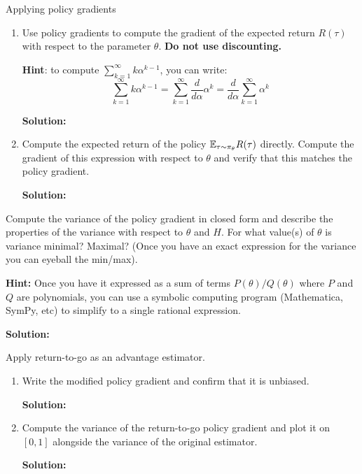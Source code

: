 \documentclass{article}
\begin{document}
\begin{enumerate}
 Applying policy gradients
\begin{enumerate}
    \item Use policy gradients to compute the gradient of the expected return $R(\tau)$ with respect to the parameter $\theta$. \textbf{Do not use discounting.}

    \textbf{Hint}: to compute $\sum_{k=1}^\infty k\alpha^{k-1}$, you can write:
    \[\sum_{k=1}^\infty k\alpha^{k-1} = \sum_{k=1}^\infty \frac{d}{d\alpha}\alpha^k = \frac{d}{d\alpha}\sum_{k=1}^\infty\alpha^k\]

\textbf{Solution:}

    \item \label{exact_gradient} Compute the expected return of the policy $\mathbb{E}_{\tau \sim \pi_\theta} R(\tau)$ directly. Compute the gradient of this expression with respect to $\theta$ and verify that this matches the policy gradient.

\textbf{Solution:}

\end{enumerate}
\newpage
{} Compute the variance of the policy gradient in closed form and describe the properties of the variance with respect to $\theta$ and $H$. For what value(s) of $\theta$ is variance minimal? Maximal? (Once you have an exact expression for the variance you can eyeball the min/max).

\textbf{Hint:}  Once you have it expressed as a sum of terms $P(\theta)/Q(\theta)$ where $P$ and $Q$ are polynomials, you can use a symbolic computing program (Mathematica, SymPy, etc) to simplify to a single rational expression.

\textbf{Solution:}

\newpage
{} Apply return-to-go as an advantage estimator.
\begin{enumerate}
    \item Write the modified policy gradient and confirm that it is unbiased.

\textbf{Solution:}

    \item Compute the variance of the return-to-go policy gradient and plot it on $[0, 1]$ alongside the variance of the original estimator.

\textbf{Solution:}


\end{enumerate}
\end{enumerate}
\end{document}
